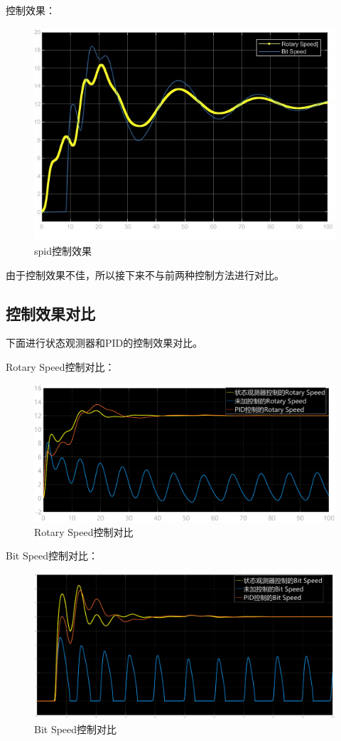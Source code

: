 \documentclass[12pt,hyperref,a4paper,UTF8]{ctexart}
\begin{document}
	控制效果：
	
	\begin{figure}[!htbp]
		\centering
		\includegraphics[width=0.7\linewidth]{figures/spid控制效果}
		\caption{spid控制效果}
		\label{fig:spid控制效果}
	\end{figure}
	
	由于控制效果不佳，所以接下来不与前两种控制方法进行对比。
	
	\subsection{控制效果对比}
	
	下面进行状态观测器和PID的控制效果对比。
	
	Rotary Speed控制对比：
	
	
	\begin{figure}[!htbp]
		\centering
		\includegraphics[width=0.7\linewidth]{figures/Rotary_Speed控制对比}
		\caption{Rotary Speed控制对比}
		\label{fig:Rotary_Speed控制对比}
	\end{figure}
	
	
	Bit Speed控制对比：
	
	\begin{figure}[!htbp]
		\centering
		\includegraphics[width=0.7\linewidth]{figures/Bit_Speed控制对比}
		\caption{Bit Speed控制对比}
		\label{fig:Bit_Speed控制对比}
	\end{figure}
	
\end{document}
